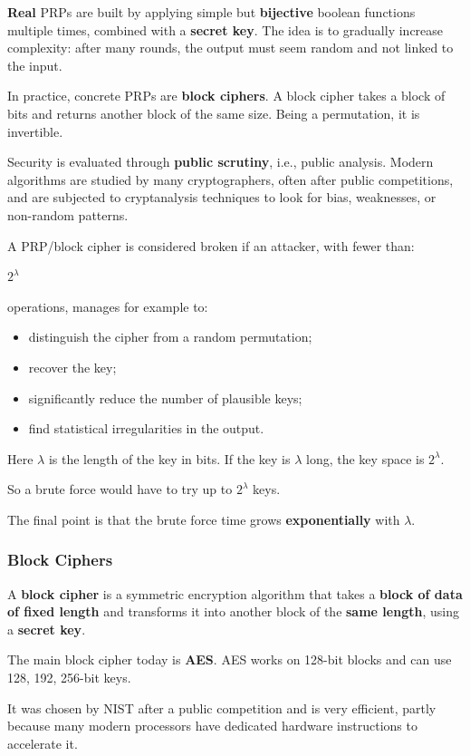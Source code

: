 \documentclass{article}
\begin{document}
\textbf{Real} PRPs are built by applying simple but \textbf{bijective} boolean functions multiple times, combined with a \textbf{secret key}. The idea is to gradually increase complexity: after many rounds, the output must seem random and not linked to the input.

In practice, concrete PRPs are \textbf{block ciphers}. A block cipher takes a block of bits and returns another block of the same size. Being a permutation, it is invertible.

Security is evaluated through \textbf{public scrutiny}, i.e., public analysis. Modern algorithms are studied by many cryptographers, often after public competitions, and are subjected to cryptanalysis techniques to look for bias, weaknesses, or non-random patterns.

A PRP/block cipher is considered broken if an attacker, with fewer than:

$2^\lambda$

operations, manages for example to:

\begin{itemize}
    \item distinguish the cipher from a random permutation;
    \item recover the key;
    \item significantly reduce the number of plausible keys;
    \item find statistical irregularities in the output.
\end{itemize}

Here $\lambda$ is the length of the key in bits. If the key is $\lambda$ long, the key space is $2^\lambda$.

So a brute force would have to try up to $2^\lambda$ keys.

The final point is that the brute force time grows \textbf{exponentially} with $\lambda$.

\subsubsection{Block Ciphers}

A \textbf{block cipher} is a symmetric encryption algorithm that takes a \textbf{block of data of fixed length} and transforms it into another block of the \textbf{same length}, using a \textbf{secret key}.

The main block cipher today is \textbf{AES}. AES works on 128-bit blocks and can use 128, 192, 256-bit keys.

It was chosen by NIST after a public competition and is very efficient, partly because many modern processors have dedicated hardware instructions to accelerate it.
\end{document}
